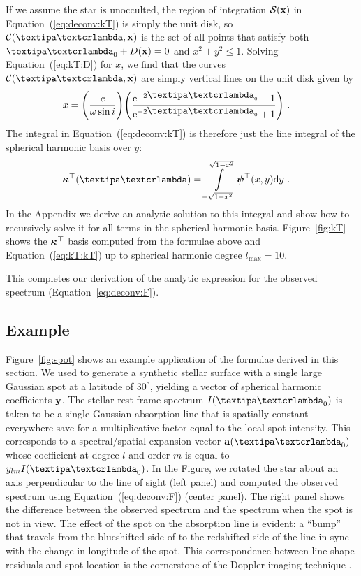 \documentclass[modern]{aastex631}
\begin{document}
If we assume the star is unocculted, the region of integration $\mathcal{S}({\mathbf{x}})$ in Equation~(\ref{eq:deconv:kT}) is simply the unit disk, so $\Curve(\lnlam, \x)$ is the set of all points that satisfy both $\lnlam_0 + \D(\x) = 0$ and $x^2 + y^2 \le 1$.
Solving Equation~(\ref{eq:kT:D}) for $x$, we find that the curves $\Curve(\lnlam, \x)$ are simply vertical lines on the unit disk given by
%
\begin{align}
    x & =
    \Bigg(\frac{c}{\omega\sin i}\Bigg)
    \Bigg(\frac{\mathrm{e}^{-2{\lnlam_0}} - 1}
    {\mathrm{e}^{-2{\lnlam_0}} + 1}\Bigg)
    \quad .
\end{align}
%
The integral in Equation~(\ref{eq:deconv:kT}) is therefore just the line integral of the spherical harmonic basis over $y$:
%
\begin{align}
    \label{eq:kT:kT}
    \kT(\lnlam)
     & =
    \int\limits_{-\sqrt{1 - x^2}}^
    {\sqrt{1 - x^2}}
    \ylmbasis
    (x, y)
    \mathrm{d}y
    \quad .
\end{align}
%
In the Appendix we derive an analytic solution to this integral and show how to recursively solve it for all terms in the spherical harmonic basis.
Figure~\ref{fig:kT} shows the $\boldsymbol{\kappa}^\top$ basis computed from the formulae above and Equation~(\ref{eq:kT:kT}) up to spherical harmonic degree $l_\mathrm{max}=10$.

This completes our derivation of the analytic expression for the observed spectrum (Equation~\ref{eq:deconv:F}).

\subsection{Example}
%
Figure~\ref{fig:spot} shows an example application of the formulae derived in this section. 
We used \starry to generate a synthetic stellar surface with a single large Gaussian spot at a latitude of $30^\circ$, yielding a vector of spherical harmonic coefficients ${\mathbf{y}}$.
The stellar rest frame spectrum $I(\lnlam_0)$ is taken to be a single Gaussian absorption line that is spatially constant everywhere save for a multiplicative factor equal to the local spot intensity.
This corresponds to a spectral/spatial expansion vector $\alm(\lnlam_0)$ whose coefficient at degree $l$ and order $m$ is equal to $y_{lm} I(\lnlam_0)$.
In the Figure, we rotated the star about an axis perpendicular to the line of sight (left panel) and computed the observed spectrum using Equation~(\ref{eq:deconv:F}) (center panel). 
The right panel shows the difference between the observed spectrum and the spectrum when the spot is not in view.
The effect of the spot on the absorption line is evident: a ``bump'' that travels from the blueshifted side of to the redshifted side of the line in sync with the change in longitude of the spot. 
This correspondence between line shape residuals and spot location is the cornerstone of the Doppler imaging technique \citep[compare to, e.g., Figures 1 and 4 in][]{Vogt1983}.
\end{document}
